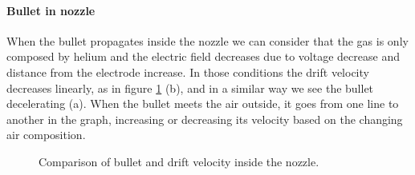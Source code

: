 \paragraph{Bullet in nozzle}
When the bullet propagates inside the nozzle we can consider that the gas is only composed by helium and the electric field decreases due to voltage decrease and distance from the electrode increase. In those conditions the drift velocity decreases linearly, as in figure \ref{fig:muE} (b), and in a similar way we see the bullet decelerating (a). When the bullet meets the air outside, it goes from one line to another in the graph, increasing or decreasing its velocity based on the changing air composition.
\begin{figure}
 \hfill
 \caption{Comparison of bullet and drift velocity inside the nozzle.}
 \label{fig:muE}
\end{figure}

